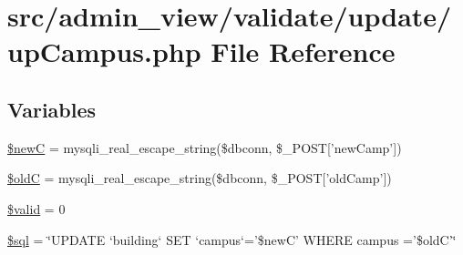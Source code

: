 \hypertarget{upCampus_8php}{\section{src/admin\-\_\-view/validate/update/up\-Campus.php \-File \-Reference}
\label{upCampus_8php}
}
\subsection*{\-Variables}
\begin{DoxyCompactItemize}
\item 
\hyperlink{upCampus_8php_ad06b2227b1785217614a1af1253505e0}{\$new\-C} = mysqli\-\_\-real\-\_\-escape\-\_\-string(\$dbconn, \$\-\_\-\-P\-O\-S\-T\mbox{[}'new\-Camp'\mbox{]})
\item 
\hyperlink{upCampus_8php_a50d27d31cd853f014465997ccb9a89f0}{\$old\-C} = mysqli\-\_\-real\-\_\-escape\-\_\-string(\$dbconn, \$\-\_\-\-P\-O\-S\-T\mbox{[}'old\-Camp'\mbox{]})
\item 
\hyperlink{upCampus_8php_a0587674d27d00ef497e08e53ccf45bbb}{\$valid} = 0
\item 
\hyperlink{upCampus_8php_a047170d6020a882807665812a27e2525}{\$sql} = \char`\"{}\-U\-P\-D\-A\-T\-E `building` \-S\-E\-T `campus`='\$new\-C' \-W\-H\-E\-R\-E campus ='\$old\-C'\char`\"{}
\end{DoxyCompactItemize}


